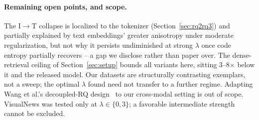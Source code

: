 \paragraph{Remaining open points, and scope.} The I$\to$T collapse is localized to the tokenizer (Section~\ref{sec:rq2rq3}) and partially explained by text embeddings' greater anisotropy under moderate regularization, but not why it persists undiminished at strong $\lambda$ once code entropy partially recovers -- a gap we disclose rather than paper over. The dense-retrieval ceiling of Section~\ref{sec:setup} bounds all variants here, sitting 3--8$\times$ below it and the released model. Our datasets are structurally contrasting exemplars, not a sweep; the optimal $\lambda$ found need not transfer to a further regime. Adapting Wang et al.'s decoupled-RQ design~\cite{wang2026decoupledrq} to our cross-modal setting is out of scope. VisualNews was tested only at $\lambda\in\{0,3\}$; a favorable intermediate strength cannot be excluded.


